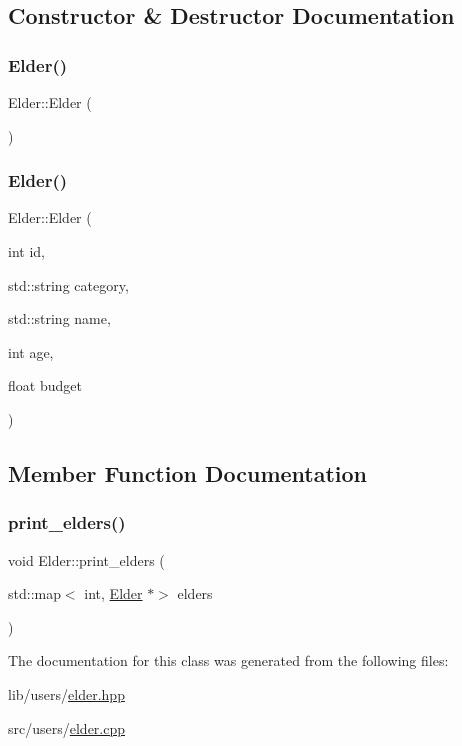 \subsection{Constructor \& Destructor Documentation}
\mbox{\label{class_elder_ad4acbee8da75a15c0296c90a5b917297}} 
\subsubsection{\texorpdfstring{Elder()}{Elder()}\hspace{0.1cm}{\footnotesize\ttfamily [1/2]}}
{\footnotesize\ttfamily Elder\+::\+Elder (\begin{DoxyParamCaption}{ }\end{DoxyParamCaption})}

\mbox{\label{class_elder_a4ce0094ee5270ed7b1fcfdeecbea952f}} 
\subsubsection{\texorpdfstring{Elder()}{Elder()}\hspace{0.1cm}{\footnotesize\ttfamily [2/2]}}
{\footnotesize\ttfamily Elder\+::\+Elder (\begin{DoxyParamCaption}\item[{int}]{id,  }\item[{std\+::string}]{category,  }\item[{std\+::string}]{name,  }\item[{int}]{age,  }\item[{float}]{budget }\end{DoxyParamCaption})}



\subsection{Member Function Documentation}
\mbox{\label{class_elder_ac48d707a0cd8be0883a53d7b543de776}} 
\subsubsection{\texorpdfstring{print\+\_\+elders()}{print\_elders()}}
{\footnotesize\ttfamily void Elder\+::print\+\_\+elders (\begin{DoxyParamCaption}\item[{std\+::map$<$ int, \hyperlink{class_elder}{Elder} $\ast$$>$}]{elders }\end{DoxyParamCaption})\hspace{0.3cm}{\ttfamily [static]}}



The documentation for this class was generated from the following files\+:\begin{DoxyCompactItemize}
\item 
lib/users/\hyperlink{elder_8hpp}{elder.\+hpp}\item 
src/users/\hyperlink{elder_8cpp}{elder.\+cpp}\end{DoxyCompactItemize}
